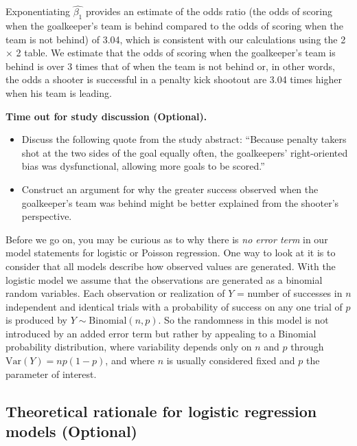 \documentclass[
]{krantz}
\begin{document}
Exponentiating \(\hat{\beta_1}\) provides an estimate of the odds ratio (the odds of scoring when the goalkeeper's team is behind compared to the odds of scoring when the team is not behind) of 3.04, which is consistent with our calculations using the 2 \(\times\) 2 table. We estimate that the odds of scoring when the goalkeeper's team is behind is over 3 times that of when the team is not behind or, in other words, the odds a shooter is successful in a penalty kick shootout are 3.04 times higher when his team is leading.

\textbf{Time out for study discussion (Optional).}

\begin{itemize}
\item
  Discuss the following quote from the study abstract: ``Because penalty takers shot at the two sides of the goal equally often, the goalkeepers' right-oriented bias was dysfunctional, allowing more goals to be scored.''
\item
  Construct an argument for why the greater success observed when the goalkeeper's team was behind might be better explained from the shooter's perspective.
\end{itemize}

Before we go on, you may be curious as to why there is \emph{no error term} in our model statements for logistic or Poisson regression. One way to look at it is to consider that all models describe how observed values are generated. With the logistic model we assume that the observations are generated as a binomial random variables. Each observation or realization of \(Y\) = number of successes in \(n\) independent and identical trials with a probability of success on any one trial of \(p\) is produced by \(Y \sim \textrm{Binomial}(n,p)\). So the randomness in this model is not introduced by an added error term but rather by appealing to a Binomial probability distribution, where variability depends only on \(n\) and \(p\) through \(\textrm{Var}(Y)=np(1-p)\), and where \(n\) is usually considered fixed and \(p\) the parameter of interest.

\hypertarget{theoretical-rationale-for-logistic-regression-models-optional}{%
\subsection{Theoretical rationale for logistic regression models (Optional)}\label{theoretical-rationale-for-logistic-regression-models-optional}}
\end{document}
